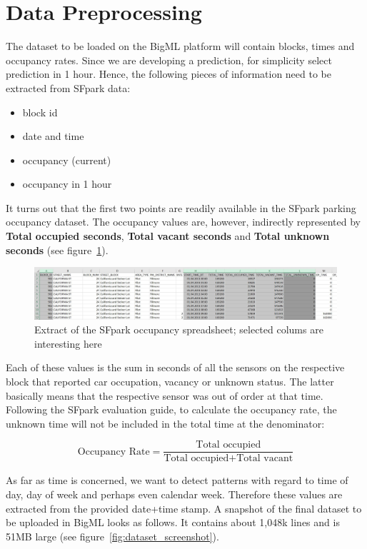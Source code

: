 \documentclass{article}
\begin{document}
\section{Data Preprocessing}
\label{sec:Data_Preprocessing}
The dataset to be loaded on the BigML platform will contain blocks, times and occupancy rates. Since we are developing a prediction, for simplicity select prediction in 1 hour. Hence, the following pieces of information need to be extracted from SFpark data:
\begin{itemize}
\item block id
\item date and time 
\item occupancy (current)
\item occupancy in 1 hour 
\end{itemize}
\vspace{2mm}

It turns out that the first two points are readily available in the SFpark parking occupancy dataset. The occupancy values are, however, indirectly represented by \textbf{Total occupied seconds}, \textbf{Total vacant seconds} and \textbf{Total unknown seconds} (see figure~\ref{fig:sfpark_occupancy_screenshot}). 
\vspace{2mm}

\begin{figure}[!ht]
    \centering
    \includegraphics[width=5.0in]{sfpark_occupancy_screenshot.jpg}
    \caption{Extract of the SFpark occupancy spreadsheet; selected colums are interesting here}
    \label{fig:sfpark_occupancy_screenshot}
\end{figure}

Each of these values is the sum in seconds of all the sensors on the respective block that reported car occupation, vacancy or unknown status. The latter basically means that the respective sensor was out of order at that time. Following the SFpark evaluation guide, to calculate the occupancy rate, the unknown time will not be included in the total time at the denominator:
\vspace{2mm}

$$
\text{Occupancy Rate} = \frac{\text{Total occupied}}{\text{Total occupied} + \text{Total vacant}}
$$

As far as time is concerned, we want to detect patterns with regard to time of day, day of week and perhaps even calendar week. Therefore these values are extracted from the provided date+time stamp. A snapshot of the final dataset to be uploaded in BigML looks as follows. It contains about 1,048k lines and is 51MB large (see figure~\ref{fig:dataset_screenshot}).
\vspace{2mm}
\end{document}
